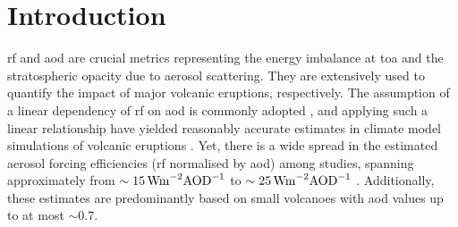 \documentclass{ametsocV6.1}
\begin{document}

\section{Introduction}



\Gls{rf} and \gls{aod} are crucial metrics representing the energy imbalance at
\gls{toa} and the stratospheric opacity due to aerosol scattering. They are extensively
used to quantify the impact of major volcanic eruptions, respectively. The assumption of
a linear dependency of \gls{rf} on \gls{aod} is commonly adopted
\citep{myhre2013,andersson2015}, and applying such a linear relationship have yielded
reasonably accurate estimates in climate model simulations of volcanic eruptions
\citep{mills2017,hansen2005,gregory2016,marshall2020,pitari2016b}. Yet, there is a wide
spread in the estimated aerosol forcing efficiencies (\gls{rf} normalised by \gls{aod})
among studies, spanning approximately from \(\sim
\SI{15}{\watt\metre^{-2}\ce{AOD}^{-1}}\) \citep{pitari2016b} to \(\sim
\SI{25}{\watt\metre^{-2}\ce{AOD}^{-1}}\) \citep{myhre2013}. Additionally, these
estimates are predominantly based on small volcanoes with \gls{aod} values up to at most
\(\sim 0.7\).
\end{document}
